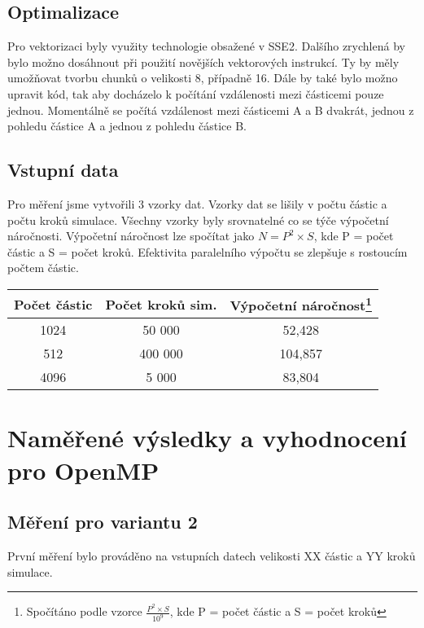 \documentclass[12pt]{article}
\begin{document}
\subsection{Optimalizace}

Pro vektorizaci byly využity technologie obsažené v SSE2. Dalšího zrychlená by bylo možno dosáhnout při použití novějších vektorových instrukcí. Ty by měly umožňovat tvorbu chunků o velikosti 8, případně 16.
Dále by také bylo možno upravit kód, tak aby docházelo k počítání vzdálenosti mezi částicemi pouze jednou. Momentálně se počítá vzdálenost mezi částicemi A a B dvakrát, jednou z pohledu částice A a jednou z pohledu částice B.

\subsection{Vstupní data}

Pro měření jsme vytvořili 3 vzorky dat. Vzorky dat se lišily v počtu částic a počtu kroků simulace. Všechny vzorky byly srovnatelné co se týče výpočetní náročnosti. Výpočetní náročnost lze spočítat jako ${N = P^2 \times S}$, kde P = počet částic a S = počet kroků. Efektivita paralelního výpočtu se zlepšuje s rostoucím počtem částic.

\begin{center}
\begin{tabular}{c | c | c }
\textbf{Počet částic} & \textbf{Počet kroků sim.}  & \textbf{Výpočetní náročnost}\footnote{Spočítáno podle vzorce ${\frac{P^2 \times S}{10^9}}$, kde P = počet částic a S = počet kroků} \\ \hline \hline
1024 & 50 000 & 52,428 \\ \hline
512 & 400 000 & 104,857 \\ \hline
4096 & 5 000 & 83,804 \\ \hline
\end{tabular}
\end{center}

\section{Naměřené výsledky a vyhodnocení pro OpenMP}

\subsection{Měření pro variantu 2}
První měření bylo prováděno na vstupních datech velikosti XX částic a YY kroků simulace.
\end{document}
